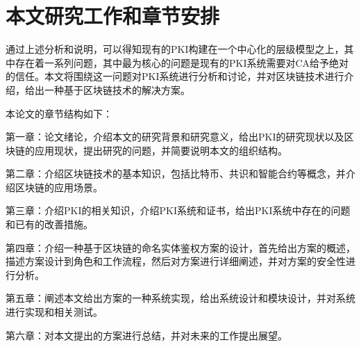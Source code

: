 









\section{本文研究工作和章节安排}


通过上述分析和说明，可以得知现有的PKI构建在一个中心化的层级模型之上，其中存在着一系列问题，其中最为核心的问题是现有的PKI系统需要对CA给予绝对的信任。本文将围绕这一问题对PKI系统进行分析和讨论，并对区块链技术进行介绍，给出一种基于区块链技术的解决方案。




本论文的章节结构如下：

第一章：论文绪论，介绍本文的研究背景和研究意义，给出PKI的研究现状以及区块链的应用现状，提出研究的问题，并简要说明本文的组织结构。

第二章：介绍区块链技术的基本知识，包括比特币、共识和智能合约等概念，并介绍区块链的应用场景。

第三章：介绍PKI的相关知识，介绍PKI系统和证书，给出PKI系统中存在的问题和已有的改善措施。

第四章：介绍一种基于区块链的命名实体鉴权方案的设计，首先给出方案的概述，描述方案设计到角色和工作流程，然后对方案进行详细阐述，并对方案的安全性进行分析。

第五章：阐述本文给出方案的一种系统实现，给出系统设计和模块设计，并对系统进行实现和相关测试。

第六章：对本文提出的方案进行总结，并对未来的工作提出展望。




